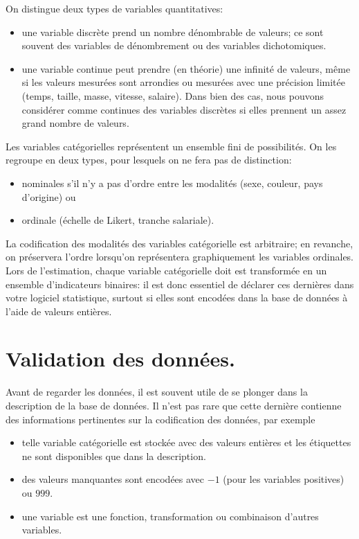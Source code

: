 \documentclass[
  11pt,
  letterpaper,
]{scrbook}
\providecommand{\tightlist}{%
  \setlength{\itemsep}{0pt}\setlength{\parskip}{0pt}}\usepackage{longtable,booktabs,array}
\theoremstyle{definition}
\theoremstyle{remark}
\begin{document}
On distingue deux types de variables quantitatives:

\begin{itemize}
\tightlist
\item
  une variable discrète prend un nombre dénombrable de valeurs; ce sont
  souvent des variables de dénombrement ou des variables dichotomiques.
\item
  une variable continue peut prendre (en théorie) une infinité de
  valeurs, même si les valeurs mesurées sont arrondies ou mesurées avec
  une précision limitée (temps, taille, masse, vitesse, salaire). Dans
  bien des cas, nous pouvons considérer comme continues des variables
  discrètes si elles prennent un assez grand nombre de valeurs.
\end{itemize}

Les variables catégorielles représentent un ensemble fini de
possibilités. On les regroupe en deux types, pour lesquels on ne fera
pas de distinction:

\begin{itemize}
\tightlist
\item
  nominales s'il n'y a pas d'ordre entre les modalités (sexe, couleur,
  pays d'origine) ou
\item
  ordinale (échelle de Likert, tranche salariale).
\end{itemize}

La codification des modalités des variables catégorielle est arbitraire;
en revanche, on préservera l'ordre lorsqu'on représentera graphiquement
les variables ordinales. Lors de l'estimation, chaque variable
catégorielle doit est transformée en un ensemble d'indicateurs binaires:
il est donc essentiel de déclarer ces dernières dans votre logiciel
statistique, surtout si elles sont encodées dans la base de données à
l'aide de valeurs entières.

\hypertarget{validation-des-donnuxe9es.}{%
\section{Validation des données.}\label{validation-des-donnuxe9es.}}

Avant de regarder les données, il est souvent utile de se plonger dans
la description de la base de données. Il n'est pas rare que cette
dernière contienne des informations pertinentes sur la codification des
données, par exemple

\begin{itemize}
\tightlist
\item
  telle variable catégorielle est stockée avec des valeurs entières et
  les étiquettes ne sont disponibles que dans la description.
\item
  des valeurs manquantes sont encodées avec \(-1\) (pour les variables
  positives) ou \(999\).
\item
  une variable est une fonction, transformation ou combinaison d'autres
  variables.
\end{itemize}
\end{document}
